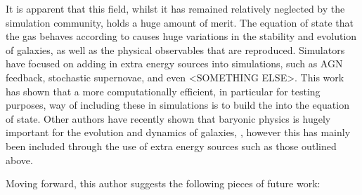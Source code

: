 It is apparent that this field, whilst it has remained relatively neglected by the simulation community, holds a huge amount of merit.
The equation of state that the gas behaves according to causes huge variations in the stability and evolution of galaxies, as well as the physical observables that are reproduced.
Simulators have focused on adding in extra energy sources into simulations, such as AGN feedback, stochastic supernovae, and even <SOMETHING ELSE>.
This work has shown that a more computationally efficient, in particular for testing purposes, way of including these in simulations is to build the into the equation of state.
Other authors have recently shown that baryonic physics is hugely important for the evolution and dynamics of galaxies, \citep{eagle, illustris}, however this has mainly been included through the use of extra energy sources such as those outlined above.

Moving forward, this author suggests the following pieces of future work:
